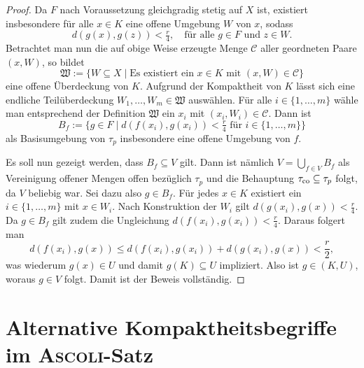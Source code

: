 \begin{proof}
  Da $F$ nach Voraussetzung gleichgradig stetig auf $X$ ist, existiert insbesondere für alle $x \in K$ eine offene Umgebung $W$ von $x$, sodass 
  \begin{displaymath}
    d(g(x),g(z)) < \tfrac{r}{4}, \quad \text{für alle $g \in F$ und $z \in W$}.
  \end{displaymath}
  Betrachtet man nun die auf obige Weise erzeugte Menge $\mathcal{C}$ aller geordneten Paare $(x,W)$, so bildet
  \begin{displaymath}
    \mathfrak{W} := \{W \subseteq X \mid \text{Es existiert ein $x \in K$ mit $(x,W) \in \mathcal{C}$} \}
  \end{displaymath}
  eine offene Überdeckung von $K$.
  Aufgrund der Kompaktheit von $K$ lässt sich eine endliche Teilüberdeckung $W_1,\dots,W_m \in \mathfrak{W}$ auswählen.
  Für alle $i \in \{ 1,\dots,m\}$ wähle man entsprechend der Definition $\mathfrak{W}$ ein $x_i$ mit $(x_i,W_i) \in \mathcal{C}$.
  Dann ist
  \begin{displaymath}
    B_f := \{ g \in F \mid d(f(x_i),g(x_i)) < \tfrac{r}{4} \text{ für } i \in \{ 1,\dots,m\}\}
  \end{displaymath}
  als Basisumgebung von $\tau_p$ insbesondere eine offene Umgebung von $f$.

  Es soll nun gezeigt werden, dass $B_f \subseteq V$ gilt.
  Dann ist nämlich $V = \bigcup_{f \in V} B_f$ als Vereinigung offener Mengen offen bezüglich $\tau_p$ und die Behauptung $\tau_{\mathrm{co}} \subseteq \tau_p$ folgt, da $V$ beliebig war.
  Sei dazu also $g \in B_f$.
  Für jedes $x \in K$ existiert ein $i \in \{1,\dots,m\}$ mit $x \in W_i$.
  Nach Konstruktion der $W_i$ gilt $d(g(x_i),g(x)) < \tfrac{r}{4}$.
  Da $g \in B_f$ gilt zudem die Ungleichung $d(f(x_i),g(x_i)) < \tfrac{r}{4}$.
  Daraus folgert man
  \begin{displaymath}
    d(f(x_i),g(x)) \leq d(f(x_i),g(x_i)) + d(g(x_i),g(x)) < \frac{r}{2},
  \end{displaymath}
  was wiederum $g(x) \in U$ und damit $g(K) \subseteq U$ impliziert. 
  Also ist $g \in (K,U)$, woraus $g \in V$ folgt.
  Damit ist der Beweis vollständig.
\end{proof}

\section{Alternative Kompaktheitsbegriffe im \textsc{Ascoli}-Satz}


